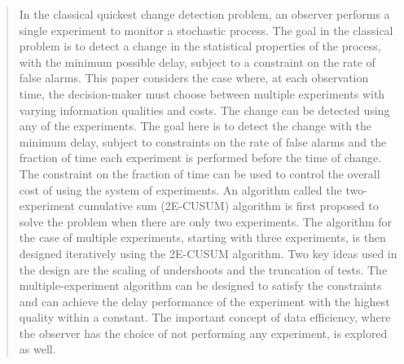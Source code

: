 \documentclass[journal, onecolumn]{IEEEtran}
\begin{document}







\maketitle






\begin{abstract}
In the classical quickest change detection problem, an observer performs a single experiment to monitor a stochastic process. The goal in the classical problem is to detect a change in the statistical properties of the process, with the minimum possible delay, subject to a constraint on the rate of false alarms. 
This paper considers the case where, at each observation time, the decision-maker must choose between multiple experiments with varying information qualities and costs. The change can be detected using any of the experiments. 
The goal here is to detect the change with the minimum delay, subject to constraints on the rate of false alarms and the fraction of time each experiment is performed before the time of change. The constraint on the fraction of time can be used to control the overall cost of using the system of experiments. An algorithm called the two-experiment cumulative sum (2E-CUSUM) algorithm is first proposed to solve the problem when there are only two experiments. 
The algorithm for the case of multiple experiments, starting with three experiments, is then designed iteratively using the 2E-CUSUM algorithm. Two key ideas used in the design 
are the scaling of undershoots and the truncation of tests. 
The multiple-experiment algorithm can be designed to satisfy the constraints and can achieve the delay performance of the experiment with the highest quality within a constant. The important concept of data efficiency, where the observer has the choice of not performing any experiment, is explored as well. 
\end{abstract}
\end{document}
